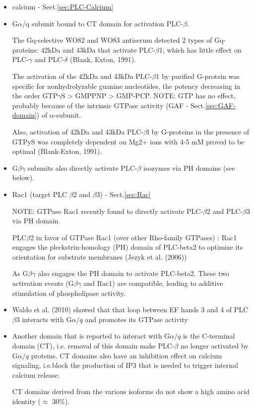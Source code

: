 \begin{itemize}
  \item calcium - Sect.\ref{sec:PLC-Calcium}
  
  \item G$\alpha$/q subunit bound to CT domain for activation PLC-$\beta$.
 
The Gq-selective WO82 and WO83 antiserum detected 2 types of Gq-proteins: 42kDa
and 43kDa that activate PLC-$\beta$1; which has little effect on PLC-$\gamma$ and
PLC-$\delta$ (Blank, Exton, 1991).

The activation of the 42kDa and 43kDa PLC-$\beta$1 by purified G-protein was
specific for nonhydrolyzable guanine nucleotides, the potency decreasing in the
order GTP$\gamma$S > GMPPNP > GMP-PCP. NOTE: GTP has no effect, probably
because of the intrinsic GTPase activity (GAF - Sect.\ref{sec:GAF-domain}) of
$\alpha$-subunit.

Also, activation of 42kDa and 43kDa PLC-$\beta$l by G-proteins
in the presence of GTPyS was completely dependent on Mg2+ ions with
4-5 mM proved to be optimal (Blank-Exton, 1991).
  
  \item G$\beta\gamma$ subunits also directly activate PLC-$\beta$ isozymes via
  PH domains (see below).

  \item Rac1 (target PLC $\beta$2 and $\beta$3) - Sect.\ref{sec:Rac}

NOTE: GTPase Rac1 recently found to directly activate PLC-$\beta$2 and
PLC-$\beta$3 via PH domain.
  
  PLC$\beta$2 in favor of GTPase Rac1 (over other Rho-family GTPases) :
  Rac1 engages the pleckstrin-homology (PH) domain of PLC-beta2 to optimize its
  orientation for substrate membranes (Jezyk et al. (2006))
  
 As G$\beta\gamma$ also engages the PH domain to activate PLC-beta2.
 These two activation events (G$\beta\gamma$ and Rac1) are compatible, leading
 to additive stimulation of phospholipase activity.
 
  
  \item  Waldo et al. (2010) showed that that loop between EF hands 3 and 4 of
  PLC$\beta$3 interacts with G$\alpha/q$ and promotes its GTPase activity

  \item  Another domain that is reported to interact with G$\alpha/q$ is the
C-terminal domain (CT), i.e. removal of this domain make PLC-$\beta$ no longer
activated by G$\alpha/q$ proteins. CT domains also have an inhibition effect on
calcium signaling, i.e.block the production of IP3 that is needed to trigger
internal calcium release.

CT domains derived from the various isoforms do not show a high amino acid
identity ($\approx$ 30\%).

\end{itemize}

